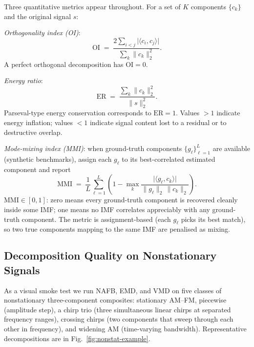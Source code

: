 \documentclass[journal]{IEEEtran}
\theoremstyle{remark}
\begin{document}
Three quantitative metrics appear throughout. For a set of $K$
components $\{c_{k}\}$ and the original signal $s$:

\emph{Orthogonality index (OI)}:
\begin{equation}
\mathrm{OI} \;=\;
 \frac{2\sum_{i < j} \lvert\langle c_{i}, c_{j}\rangle\rvert}%
      {\sum_{k}\|c_{k}\|_{2}^{2}} .
\label{eq:oi}
\end{equation}
A perfect orthogonal decomposition has $\mathrm{OI} = 0$.

\emph{Energy ratio}:
\begin{equation}
\mathrm{ER} \;=\;
 \frac{\sum_{k}\|c_{k}\|_{2}^{2}}{\|s\|_{2}^{2}} .
\label{eq:er}
\end{equation}
Parseval-type energy conservation corresponds to $\mathrm{ER} = 1$.
Values $>1$ indicate energy inflation; values $<1$ indicate signal
content lost to a residual or to destructive overlap.

\emph{Mode-mixing index (MMI)}: when ground-truth components
$\{g_{\ell}\}_{\ell = 1}^{L}$ are available (synthetic benchmarks),
assign each $g_{\ell}$ to its best-correlated estimated component and
report
\begin{equation}
\mathrm{MMI} \;=\;
 \frac{1}{L}\sum_{\ell=1}^{L}
 \left(
   1 - \max_{k}
   \frac{\lvert\langle g_{\ell}, c_{k}\rangle\rvert}
        {\|g_{\ell}\|_{2}\,\|c_{k}\|_{2}}
 \right) .
\label{eq:mmi}
\end{equation}
$\mathrm{MMI} \in [0, 1]$: zero means every ground-truth component is
recovered cleanly inside some IMF; one means no IMF correlates
appreciably with any ground-truth component. The metric is
assignment-based (each $g_{\ell}$ picks its best match), so two true
components mapping to the same IMF are penalised as mixing.

\subsection{Decomposition Quality on Nonstationary Signals}
\label{subsec:decomp}

As a visual smoke test we run NAFB, EMD, and VMD on five classes of
nonstationary three-component composites: stationary AM--FM, piecewise
(amplitude step), a chirp trio (three simultaneous linear chirps at
separated frequency ranges), crossing chirps (two components that
sweep through each other in frequency), and widening AM (time-varying
bandwidth). Representative decompositions are in
Fig.~\ref{fig:nonstat-example}.
\end{document}

